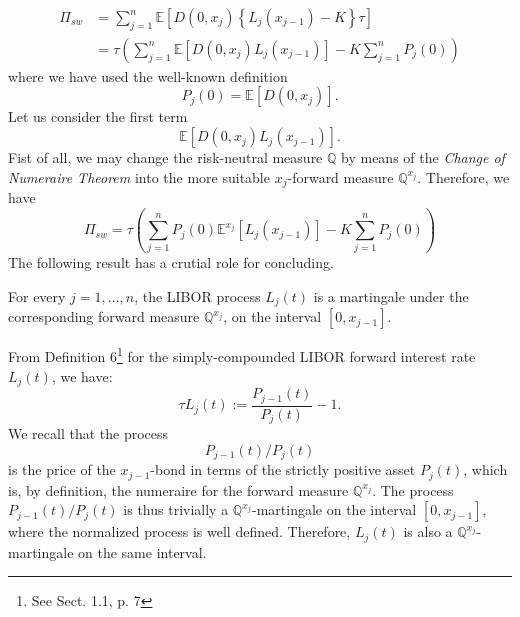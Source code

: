 \begin{equation}
\begin{split}
\Pi_{sw}& =\sum_{j=1}^n\mathbb{E}\left[ D(0,x_j)
  \left\{L_j(x_{j-1})-K\right\}\tau \right] \\
& = \tau \left(\sum_{j=1}^n \mathbb{E}\left[D(0,x_j)L_j(x_{j-1})
  \right]-K\sum_{j=1}^n P_j(0) \right)  
\end{split}
\end{equation}
where we have used %
the well-known definition $$P_j(0)=
\mathbb{E}\left[ D(0,x_j)\right].$$ Let us consider the first term
$$
\mathbb{E}\left[ D(0,x_j) L_j(x_{j-1}) \right].
$$
Fist of all, we may change the risk-neutral measure $\mathbb{Q}$ by
means of the \emph{Change of Numeraire Theorem} into the more suitable
$x_j$-forward measure $\mathbb{Q}^{x_j}$. Therefore, we have
\begin{equation}
\label{SwValuation}
\Pi_{sw}=\tau \left(\sum_{j=1}^n P_j(0) \mathbb{E}^{x_j} \left[ L_j(x_{j-1})
  \right] -K\sum_{j=1}^n P_j(0) \right)  
\end{equation}
The following result has a crutial role for concluding.
\begin{lema}
For every $j=1, \dots, n$, the LIBOR process $L_j(t)$ is a martingale
under the corresponding forward measure $\mathbb{Q}^{x_j}$, on the
interval $[0,x_{j-1}]$.
\end{lema}
\begin{demo}
From Definition 6\footnote{See Sect. 1.1, p. 7} for the 
sim\-ply-\-com\-poun\-ded LIBOR forward interest rate $L_j(t)$, we
have: 
$$
\tau L_j(t):=\frac{P_{j-1}(t)}{P_j(t)}-1.
$$
We recall that the process $$P_{j-1}(t)/P_j(t)$$ is the price of the
$x_{j-1}$-bond in terms of the strictly positive asset $P_j(t)$, which is, by
definition, the numeraire for the forward measure
$\mathbb{Q}^{x_j}$. The process $P_{j-1}(t)/P_j(t)$ is thus trivially
a $\mathbb{Q}^{x_j}$-martingale on the interval $[0,x_{j-1}]$, where
the normalized process is well defined. Therefore, $L_j(t)$ is also a
$\mathbb{Q}^{x_j}$-martingale on the same interval. \end{demo}  

